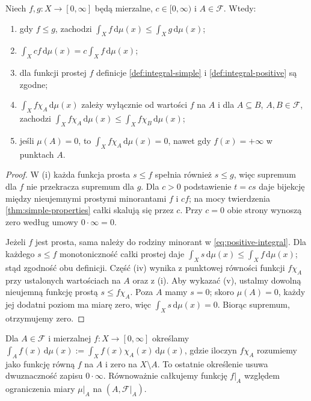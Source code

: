 \begin{twierdzenie}
\label{thm:nonnegative-first-properties}
Niech $f,g:X\to[0,\infty]$ będą mierzalne,
$c\in[0,\infty)$ i $A\in\mathcal F$. Wtedy:
\begin{enumerate}[label=\textup{(\roman*)}]
\item gdy $f\le g$, zachodzi
$\int_X f\,\mathrm d\mu(x)\le\int_Xg\,\mathrm d\mu(x)$;
\item $\int_X cf\,\mathrm d\mu(x)=c\int_Xf\,\mathrm d\mu(x)$;
\item dla funkcji prostej $f$ definicje
\ref{def:integral-simple} i \ref{def:integral-positive}
są zgodne;
\item $\int_X f\chi_A\,\mathrm d\mu(x)$ zależy
wyłącznie od wartości $f$ na $A$ i dla
$A\subseteq B$, $A,B\in\mathcal F$, zachodzi
$\int_X f\chi_A\,\mathrm d\mu(x)\le
\int_Xf\chi_B\,\mathrm d\mu(x)$;
\item jeśli $\mu(A)=0$, to
$\int_X f\chi_A\,\mathrm d\mu(x)=0$,
nawet gdy $f(x)=+\infty$ w punktach $A$.
\end{enumerate}
\end{twierdzenie}
\begin{proof}
W (i) każda funkcja prosta $s\le f$ spełnia
również $s\le g$, więc supremum dla $f$
nie przekracza supremum dla $g$.
Dla $c>0$ podstawienie $t=cs$ daje bijekcję
między nieujemnymi prostymi minorantami $f$ i $cf$;
na mocy twierdzenia \ref{thm:simple-properties}
całki skalują się przez $c$. Przy $c=0$ obie
strony wynoszą zero według umowy $0\cdot\infty=0$.

Jeżeli $f$ jest prosta, sama należy do rodziny
minorant w \eqref{eq:positive-integral}. Dla każdego
$s\le f$ monotoniczność całki prostej daje
$\int_Xs\,\mathrm d\mu(x)\le\int_Xf\,\mathrm d\mu(x)$;
stąd zgodność obu definicji.
Część (iv) wynika z punktowej równości funkcji
$f\chi_A$ przy ustalonych wartościach na $A$
oraz z (i). Aby wykazać (v), ustalmy dowolną
nieujemną funkcję prostą $s\le f\chi_A$.
Poza $A$ mamy $s=0$; skoro $\mu(A)=0$,
każdy jej dodatni poziom ma miarę zero, więc
$\int_Xs\,\mathrm d\mu(x)=0$.
Biorąc supremum, otrzymujemy zero.
\end{proof}

\begin{definicja}
\label{def:integral-over-set}
Dla $A\in\mathcal F$ i mierzalnej $f:X\to[0,\infty]$
określamy
$\int_A f(x)\,\mathrm d\mu(x):=
\int_X f(x)\chi_A(x)\,\mathrm d\mu(x)$,
gdzie iloczyn $f\chi_A$ rozumiemy jako funkcję
równą $f$ na $A$ i zero na $X\setminus A$.
To ostatnie określenie usuwa dwuznaczność zapisu
$0\cdot\infty$. Równoważnie całkujemy funkcję
$f|_A$ względem ograniczenia miary $\mu|_A$
na $(A,\mathcal F|_A)$.
\end{definicja}

